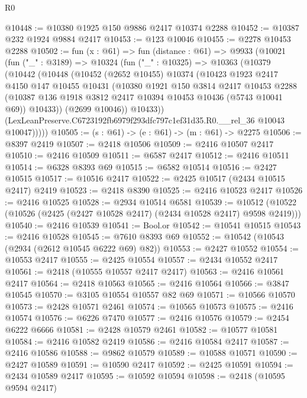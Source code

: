 \begin{lexlean}{R0}
\begin{coremodule}
@10448 := @10380 @1925 @150 @9886 @2417 @10374 @2288
@10452 := @10387 @232 @1924 @9884 @2417
@10453 := @123 @10046
@10455 := @2278 @10453 @2288
@10502 := fun (x : @61) =>
  fun (distance : @61) =>
  @9933
    (@10021
      (fun ("_" : @3189) =>
      @10324
        (fun ("_" : @10325) =>
        @10363
          (@10379
            (@10442
              (@10448
                (@10452
                  (@2652 @10455)
                  @10374
                  (@10423
                    @1923
                    @2417
                    @4150
                    @147
                    @10455
                    @10431
                    (@10380
                      @1921
                      @150
                      @3814
                      @2417
                      @10453
                      @2288
                      (@10387 @136 @1918 @3812 @2417 @10394 @10453 @10436 (@5743 @10041 @69))
                      @10433))
                  (@2699 @10046))
                @10433))
            (LexLeanPreserve.C6723192fb6979f293dfc797c1ef31d35.R0.__rel_36 @10043 @10047)))))
@10505 := (s : @61) -> (e : @61) -> (m : @61) -> @2275
@10506 := @8397 @2419
@10507 := @2418 @10506
@10509 := @2416 @10507 @2417
@10510 := @2416 @10509
@10511 := @6587 @2417
@10512 := @2416 @10511
@10514 := @6328 @8393 @69
@10515 := @6582 @10514
@10516 := @2427 @10515
@10517 := @10516 @2417
@10522 := @2425 @10517 (@2434 @10515 @2417) @2419
@10523 := @2418 @8390
@10525 := @2416 @10523 @2417
@10526 := @2416 @10525
@10528 := @2934 @10514 @6581
@10539 := @10512 (@10522 (@10526 (@2425 (@2427 @10528 @2417) (@2434 @10528 @2417) @9598 @2419)))
@10540 := @2416 @10539
@10541 := Bool.or
@10542 := @10541 @10515
@10543 := @2416 @10528
@10545 := @7610 @8393 @69
@10552 := @10542 (@10543 (@2934 (@2612 @10545 @6222 @69) @82))
@10553 := @2427 @10552
@10554 := @10553 @2417
@10555 := @2425 @10554
@10557 := @2434 @10552 @2417
@10561 := @2418 (@10555 @10557 @2417 @2417)
@10563 := @2416 @10561 @2417
@10564 := @2418 @10563
@10565 := @2416 @10564
@10566 := @3847 @10545
@10570 := @3105 @10554 @10557 @82 @69
@10571 := @10566 @10570
@10573 := @2428 @10571 @2461
@10574 := @10565 @10573
@10575 := @2416 @10574
@10576 := @6226 @7470
@10577 := @2416 @10576
@10579 := @2454 @6222 @6666
@10581 := @2428 @10579 @2461
@10582 := @10577 @10581
@10584 := @2416 @10582 @2419
@10586 := @2416 @10584 @2417
@10587 := @2416 @10586
@10588 := @9862 @10579
@10589 := @10588 @10571
@10590 := @2427 @10589
@10591 := @10590 @2417
@10592 := @2425 @10591
@10594 := @2434 @10589 @2417
@10595 := @10592 @10594
@10598 := @2418 (@10595 @9594 @2417)

\end{coremodule}
\end{lexlean}
